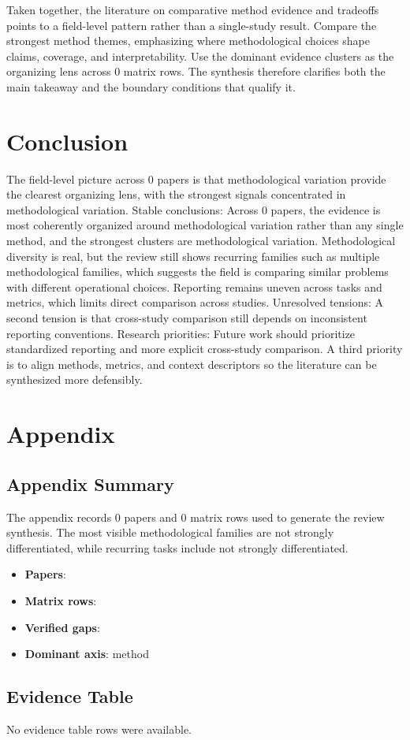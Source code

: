 \documentclass{article}
\begin{document}
Taken together, the literature on comparative method evidence and tradeoffs points to a field-level pattern rather than a single-study result. Compare the strongest method themes, emphasizing where methodological choices shape claims, coverage, and interpretability. Use the dominant evidence clusters as the organizing lens across 0 matrix rows. The synthesis therefore clarifies both the main takeaway and the boundary conditions that qualify it.

\section{Conclusion}
The field-level picture across 0 papers is that methodological variation provide the clearest organizing lens, with the strongest signals concentrated in methodological variation. Stable conclusions: Across 0 papers, the evidence is most coherently organized around methodological variation rather than any single method, and the strongest clusters are methodological variation. Methodological diversity is real, but the review still shows recurring families such as multiple methodological families, which suggests the field is comparing similar problems with different operational choices. Reporting remains uneven across tasks and metrics, which limits direct comparison across studies. Unresolved tensions: A second tension is that cross-study comparison still depends on inconsistent reporting conventions. Research priorities: Future work should prioritize standardized reporting and more explicit cross-study comparison. A third priority is to align methods, metrics, and context descriptors so the literature can be synthesized more defensibly.

\appendix
\section{Appendix}
\subsection{Appendix Summary}
\noindent The appendix records 0 papers and 0 matrix rows used to generate the review synthesis. The most visible methodological families are not strongly differentiated, while recurring tasks include not strongly differentiated.

\begin{itemize}
\item \textbf{Papers}: 
\item \textbf{Matrix rows}: 
\item \textbf{Verified gaps}: 
\item \textbf{Dominant axis}: method
\end{itemize}

\subsection{Evidence Table}
\noindent No evidence table rows were available.
\end{document}
